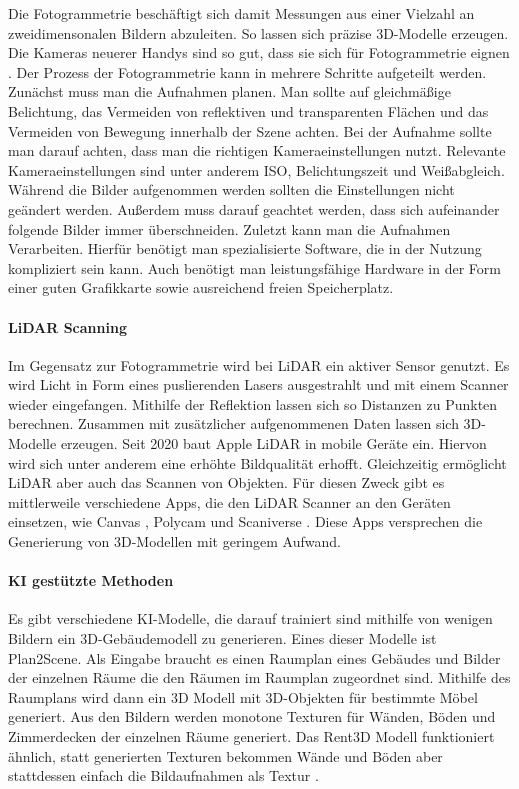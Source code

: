 Die Fotogrammetrie beschäftigt sich damit Messungen aus einer Vielzahl an zweidimensonalen Bildern abzuleiten. So lassen sich präzise 3D-Modelle erzeugen.\cite[S.~19]{Aber2010} Die Kameras neuerer Handys sind so gut, dass sie sich für Fotogrammetrie eignen \cite{Cohrs2021}. Der Prozess der Fotogrammetrie kann in mehrere Schritte aufgeteilt werden. Zunächst muss man die Aufnahmen planen. Man sollte auf gleichmäßige Belichtung, das Vermeiden von reflektiven und transparenten Flächen und das Vermeiden von Bewegung innerhalb der Szene achten. Bei der Aufnahme sollte man darauf achten, dass man die richtigen Kameraeinstellungen nutzt. Relevante Kameraeinstellungen sind unter anderem ISO, Belichtungszeit und Weißabgleich. Während die Bilder aufgenommen werden sollten die Einstellungen nicht geändert werden. Außerdem muss darauf geachtet werden, dass sich aufeinander folgende Bilder immer überschneiden.\cite{Cohrs2021b} Zuletzt kann man die Aufnahmen Verarbeiten. Hierfür benötigt man spezialisierte Software, die in der Nutzung kompliziert sein kann. Auch benötigt man leistungsfähige Hardware in der Form einer guten Grafikkarte sowie ausreichend freien Speicherplatz.\cite{Cohrs2021c}

\paragraph{LiDAR Scanning}
Im Gegensatz zur Fotogrammetrie wird bei \ac{LiDAR} ein aktiver Sensor genutzt. Es wird Licht in Form eines puslierenden Lasers ausgestrahlt und mit einem Scanner wieder eingefangen. Mithilfe der Reflektion lassen sich so Distanzen zu Punkten berechnen. Zusammen mit zusätzlicher aufgenommenen Daten lassen sich 3D-Modelle erzeugen. Seit 2020 baut Apple \ac{LiDAR} in mobile Geräte ein. Hiervon wird sich unter anderem eine erhöhte Bildqualität erhofft. Gleichzeitig ermöglicht LiDAR aber auch das Scannen von Objekten.\cite{Fenstermaker2022} Für diesen Zweck gibt es mittlerweile verschiedene Apps, die den LiDAR Scanner an den Geräten einsetzen, wie Canvas \cite{Canvas2023}, Polycam \cite{Polycam2024} und Scaniverse \cite{Scaniverse2024}. Diese Apps versprechen die Generierung von 3D-Modellen mit geringem Aufwand.

\paragraph{KI gestützte Methoden}
Es gibt verschiedene KI-Modelle, die darauf trainiert sind mithilfe von wenigen Bildern ein 3D-Gebäudemodell zu generieren. Eines dieser Modelle ist Plan2Scene. Als Eingabe braucht es einen Raumplan eines Gebäudes und Bilder der einzelnen Räume die den Räumen im Raumplan zugeordnet sind. Mithilfe des Raumplans wird dann ein 3D Modell mit 3D-Objekten für bestimmte Möbel generiert. Aus den Bildern werden monotone Texturen für Wänden, Böden und Zimmerdecken der einzelnen Räume generiert.\cite[S.~10733]{Plan2Scene2021} Das Rent3D Modell funktioniert ähnlich, statt generierten Texturen bekommen Wände und Böden aber stattdessen einfach die Bildaufnahmen als Textur \cite[S.~3413]{Rent3D2015}.

